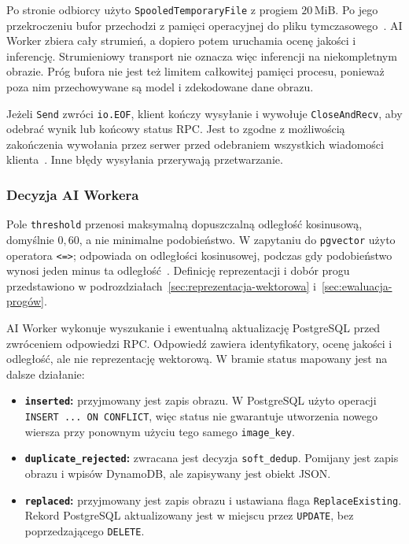 Po stronie odbiorcy użyto \texttt{SpooledTemporaryFile}
z progiem \(20\,\mathrm{MiB}\).
Po jego przekroczeniu bufor przechodzi z pamięci operacyjnej do pliku
tymczasowego~\cite{python_tempfile}.
AI Worker zbiera cały strumień, a dopiero potem uruchamia ocenę
jakości i inferencję. Strumieniowy transport nie oznacza więc
inferencji na niekompletnym obrazie.
Próg bufora nie jest też limitem całkowitej pamięci procesu,
ponieważ poza nim przechowywane są model i zdekodowane dane obrazu.

Jeżeli \texttt{Send} zwróci \texttt{io.EOF}, klient kończy wysyłanie
i wywołuje \texttt{CloseAndRecv}, aby odebrać wynik lub końcowy
status RPC. Jest to zgodne z możliwością zakończenia wywołania
przez serwer przed odebraniem wszystkich wiadomości
klienta~\cite{grpc_core_concepts}.
Inne błędy wysyłania przerywają przetwarzanie.

\subsubsection{Decyzja AI Workera}

Pole \texttt{threshold} przenosi maksymalną dopuszczalną odległość
kosinusową, domyślnie \(0{,}60\), a nie minimalne podobieństwo.
W zapytaniu do \texttt{pgvector} użyto operatora \texttt{<=>};
odpowiada on odległości kosinusowej, podczas gdy podobieństwo
wynosi jeden minus ta odległość~\cite{pgvector_docs}.
Definicję reprezentacji i dobór progu przedstawiono
w podrozdziałach~\ref{sec:reprezentacja-wektorowa}
i~\ref{sec:ewaluacja-progów}.

AI Worker wykonuje wyszukanie i ewentualną aktualizację
PostgreSQL przed zwróceniem odpowiedzi RPC.
Odpowiedź zawiera identyfikatory, ocenę jakości i odległość,
ale nie reprezentację wektorową.
W bramie status mapowany jest na dalsze działanie:

\begin{itemize}
    \item \textbf{\texttt{inserted}:}
    przyjmowany jest zapis obrazu.
    W PostgreSQL użyto operacji \texttt{INSERT ... ON CONFLICT},
    więc status nie gwarantuje utworzenia nowego wiersza przy
    ponownym użyciu tego samego \texttt{image\_key}.
    \item \textbf{\texttt{duplicate\_rejected}:}
    zwracana jest decyzja \texttt{soft\_dedup}.
    Pomijany jest zapis obrazu i wpisów DynamoDB, ale zapisywany
    jest obiekt JSON.
    \item \textbf{\texttt{replaced}:}
    przyjmowany jest zapis obrazu i ustawiana flaga
    \texttt{ReplaceExisting}. Rekord PostgreSQL aktualizowany
    jest w miejscu przez \texttt{UPDATE}, bez poprzedzającego
    \texttt{DELETE}.
\end{itemize}

